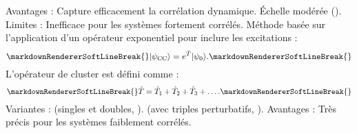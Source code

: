 \markdownRendererUlEndTight \markdownRendererOlItemEnd 
\markdownRendererOlEndTight \markdownRendererInterblockSeparator
{}\markdownRendererInterblockSeparator
{}\markdownRendererUlBeginTight
\markdownRendererUlItem Avantages :\markdownRendererInterblockSeparator
{}\markdownRendererUlBeginTight
\markdownRendererUlItem Capture efficacement la corrélation dynamique.\markdownRendererUlItemEnd 
\markdownRendererUlItem Échelle modérée ().\markdownRendererUlItemEnd 
\markdownRendererUlEndTight \markdownRendererUlItemEnd 
\markdownRendererUlItem Limites :\markdownRendererInterblockSeparator
{}\markdownRendererUlBeginTight
\markdownRendererUlItem Inefficace pour les systèmes fortement corrélés.\markdownRendererUlItemEnd 
\markdownRendererUlEndTight \markdownRendererUlItemEnd 
\markdownRendererUlEndTight \markdownRendererInterblockSeparator
{}\markdownRendererOlBeginTight
{}\markdownRendererInterblockSeparator
{}\markdownRendererUlBegin
\markdownRendererUlItem Méthode basée sur l'application d'un opérateur exponentiel pour inclure les excitations :\markdownRendererSoftLineBreak
{}\begin{equation}\markdownRendererSoftLineBreak
{}|\psi_{\text{CC}}\rangle = e^{\hat{T}} |\psi_0\rangle .\markdownRendererSoftLineBreak
{}\end{equation}\markdownRendererUlItemEnd 
\markdownRendererUlItem L'opérateur de cluster  est défini comme :\markdownRendererSoftLineBreak
{}\begin{equation}\markdownRendererSoftLineBreak
{}\hat{T} = \hat{T}_1 + \hat{T}_2 + \hat{T}_3 + \dots .\markdownRendererSoftLineBreak
{}\end{equation}\markdownRendererUlItemEnd 
\markdownRendererUlItem Variantes :\markdownRendererInterblockSeparator
{}\markdownRendererUlBeginTight
\markdownRendererUlItem {} (singles et doubles, ).\markdownRendererUlItemEnd 
\markdownRendererUlItem {} (avec triples perturbatifs, ).\markdownRendererUlItemEnd 
\markdownRendererUlEndTight \markdownRendererUlItemEnd 
\markdownRendererUlItem Avantages :\markdownRendererInterblockSeparator
{}\markdownRendererUlBeginTight
\markdownRendererUlItem Très précis pour les systèmes faiblement corrélés.\markdownRendererUlItemEnd 
